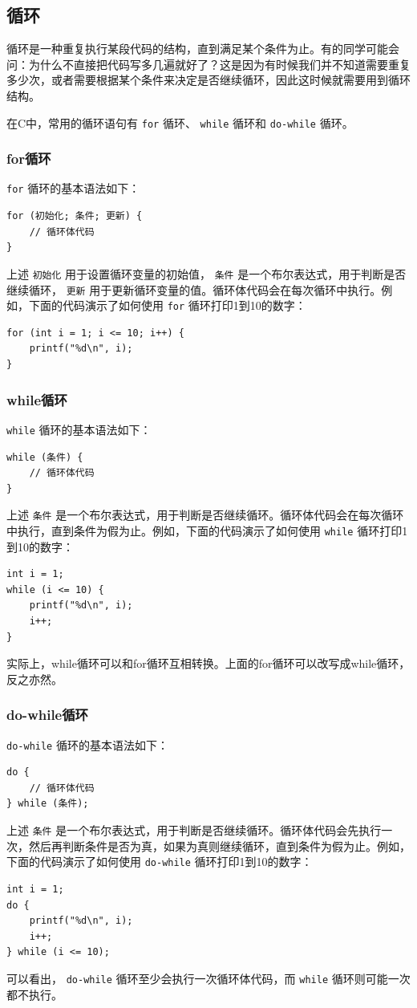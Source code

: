 \subsection{循环}

循环是一种重复执行某段代码的结构，直到满足某个条件为止。有的同学可能会问：为什么不直接把代码写多几遍就好了？这是因为有时候我们并不知道需要重复多少次，或者需要根据某个条件来决定是否继续循环，因此这时候就需要用到循环结构。

在C中，常用的循环语句有 \texttt{for} 循环、 \texttt{while} 循环和 \texttt{do-while} 循环。

\subsubsection{for循环}

\texttt{for} 循环的基本语法如下：
\begin{verbatim}
for (初始化; 条件; 更新) {
    // 循环体代码
}
\end{verbatim}
上述 \texttt{初始化} 用于设置循环变量的初始值， \texttt{条件} 是一个布尔表达式，用于判断是否继续循环， \texttt{更新} 用于更新循环变量的值。循环体代码会在每次循环中执行。例如，下面的代码演示了如何使用 \texttt{for} 循环打印1到10的数字：
\begin{verbatim}
for (int i = 1; i <= 10; i++) {
    printf("%d\n", i);
}
\end{verbatim}

\subsubsection{while循环}
\texttt{while} 循环的基本语法如下：
\begin{verbatim}
while (条件) {
    // 循环体代码
}
\end{verbatim}
上述 \texttt{条件} 是一个布尔表达式，用于判断是否继续循环。循环体代码会在每次循环中执行，直到条件为假为止。例如，下面的代码演示了如何使用 \texttt{while} 循环打印1到10的数字：
\begin{verbatim}
int i = 1;
while (i <= 10) {
    printf("%d\n", i);
    i++;
}
\end{verbatim}

实际上，while循环可以和for循环互相转换。上面的for循环可以改写成while循环，反之亦然。

\subsubsection{do-while循环}
\texttt{do-while} 循环的基本语法如下：
\begin{verbatim}
do {
    // 循环体代码
} while (条件);
\end{verbatim}
上述 \texttt{条件} 是一个布尔表达式，用于判断是否继续循环。循环体代码会先执行一次，然后再判断条件是否为真，如果为真则继续循环，直到条件为假为止。例如，下面的代码演示了如何使用 \texttt{do-while} 循环打印1到10的数字：
\begin{verbatim}
int i = 1;
do {
    printf("%d\n", i);
    i++;
} while (i <= 10);
\end{verbatim}
可以看出， \texttt{do-while} 循环至少会执行一次循环体代码，而 \texttt{while} 循环则可能一次都不执行。

